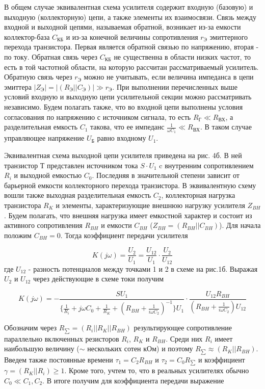 В общем случае эквивалентная схема усилителя содержит входную (базовую) и выходную (коллекторную) цепи, а также элементы их взаимосвязи. Связь между входной и выходной цепями, называемая обратной, возникает из-за емкости коллектор-база $C_{\text{КБ}}$ и из-за конечной величины сопротивления $r_{\text{Э}}$ эмиттерного перехода транзистора. Первая является обратной связью по напряжению, вторая - по току. Обратная связь через $C_{\text{КБ}}$ не существенна в области низких частот, то есть в той частотной области, на которую рассчитан рассматриваемый усилитель. Обратную связь через $r_{\text{Э}}$ можно не учитывать, если величина импеданса в цепи эмиттера $|Z_{\text{Э}}|=| (R_{\text{Э}}||C_{\text{Э}})|\gg r_{\text{Э}}$. При выполнении перечисленных выше условий входную и выходную цепи усилительной секции можно рассматривать независимо. Будем полагать также, что во входной цепи выполнены условия согласования по напряжению с источником сигнала, то есть $R_{\text{Г}} \ll R_{\text{ВХ}}$, а разделительная емкость $C_1$ такова, что ее импеданс $\frac{1}{\omega C_1} \ll R_{\text{ВХ}}$. В таком случае управляющее напряжение $U_{\text{Б}}$ равно входному $U_1$.

Эквивалентная схема выходной цепи усилителя приведена на рис. 4б. В ней транзистор Т представлен источником тока $S\cdot U_1$ c внутренним сопротивлением $R_i$ и выходной емкостью $C_0$. Последняя в значительной степени зависит от барьерной емкости коллекторного перехода транзистора. В эквивалентную схему вошли также выходная разделительная емкость $C_2$, коллекторная нагрузка транзистора $R_K$ и элементы, характеризующие внешнюю нагрузку усилителя $Z_{BH}$. Будем полагать, что внешняя нагрузка имеет емкостной характер и состоит из активного сопротивления $R_{BH}$ и емкости $C_{BH}$ ($Z_{BH}=(R_{BH}||C_{BH})$). Для начала положим $C_{BH}=0$. Тогда коэффициент передачи усилителя

$$K(j\omega)=\frac{U_2}{U_1}=\frac{U_{12}}{U_1} \cdot \frac{U_2}{U_{12}}$$
где $U_{12}$ - разность потенциалов между точками 1 и 2 в схеме на рис.1б. Выражая $U_2$ и $U_{12}$ через действующие в схеме токи получим

$$K(j\omega)=-\frac{SU_1}{\{\frac{1}{R_i}+j\omega C_0+\frac{1}{R_K}+(R_{BH}+\frac{1}{i\omega C_2})^{-1}\}U_1} \cdot \frac{U_{12}R_{BH}}{(R_{BH}+\frac{1}{i\omega C_2})U_{12}}$$

Обозначим через $R_{\sum}=(R_i||R_K||R_{BH})$ результирующее сопротивление параллельно включенных резисторов $R_i$, $R_K$ и $R_{BH}$. Среди них $R_i$ имеет наибольшую величину ($\sim$ нескольких сотен кОм) и поэтому $R_{\sum} \approx (R_K||R_{BH})$. Введем также постоянные времени $\tau_1=C_2 R_{BH}$ и $\tau_2=C_0 R_{\sum}$ и коэффициент $\gamma=(R_K||R_i)\geq 1$. Кроме того, учтем то, что в реальных усилителях обычно $C_0 \ll C_1,C_2$. В итоге получим для коэффициента передачи выражение

